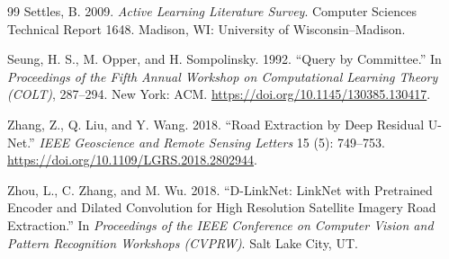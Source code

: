 \documentclass[11pt]{article}
\begin{document}
\begin{thebibliography}{99}
 Settles, B. 2009. \emph{Active Learning Literature Survey}. Computer Sciences Technical Report 1648. Madison, WI: University of Wisconsin--Madison.

 Seung, H. S., M. Opper, and H. Sompolinsky. 1992. ``Query by Committee.'' In \emph{Proceedings of the Fifth Annual Workshop on Computational Learning Theory (COLT)}, 287--294. New York: ACM. \url{https://doi.org/10.1145/130385.130417}.

 Zhang, Z., Q. Liu, and Y. Wang. 2018. ``Road Extraction by Deep Residual U-Net.'' \emph{IEEE Geoscience and Remote Sensing Letters} 15 (5): 749--753. \url{https://doi.org/10.1109/LGRS.2018.2802944}.

 Zhou, L., C. Zhang, and M. Wu. 2018. ``D-LinkNet: LinkNet with Pretrained Encoder and Dilated Convolution for High Resolution Satellite Imagery Road Extraction.'' In \emph{Proceedings of the IEEE Conference on Computer Vision and Pattern Recognition Workshops (CVPRW)}. Salt Lake City, UT.

\end{thebibliography}
\end{document}
